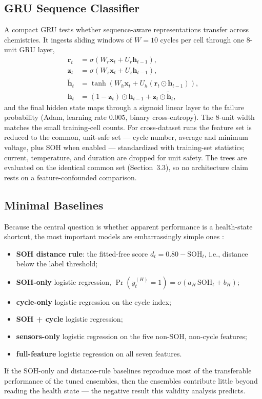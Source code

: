 \documentclass[preprint,12pt]{elsarticle}
\begin{document}
\subsection{GRU Sequence Classifier}
A compact GRU tests whether sequence-aware representations transfer across chemistries. It ingests sliding windows of $W{=}10$ cycles per cell through one 8-unit GRU layer,
\begin{equation}\label{eq:gru}
\begin{aligned}
\mathbf{r}_t &= \sigma(W_r\mathbf{x}_t + U_r\mathbf{h}_{t-1}),\\[2pt]
\mathbf{z}_t &= \sigma(W_z\mathbf{x}_t + U_z\mathbf{h}_{t-1}),\\[2pt]
\tilde{\mathbf{h}}_t &= \tanh(W_h\mathbf{x}_t + U_h(\mathbf{r}_t\odot\mathbf{h}_{t-1})),\\[2pt]
\mathbf{h}_t &= (1-\mathbf{z}_t)\odot\mathbf{h}_{t-1} + \mathbf{z}_t\odot\tilde{\mathbf{h}}_t,
\end{aligned}
\end{equation}
and the final hidden state maps through a sigmoid linear layer to the failure probability (Adam, learning rate 0.005, binary cross-entropy). The 8-unit width matches the small training-cell counts. For cross-dataset runs the feature set is reduced to the common, unit-safe set --- cycle number, average and minimum voltage, plus SOH when enabled --- standardized with training-set statistics; current, temperature, and duration are dropped for unit safety. The trees are evaluated on the identical common set (Section~3.3), so no architecture claim rests on a feature-confounded comparison.

\subsection{Minimal Baselines}
Because the central question is whether apparent performance is a health-state shortcut, the most important models are embarrassingly simple ones \cite{shikdar2026learning}:
\begin{itemize}
\item \textbf{SOH distance rule}: the fitted-free score $d_t = 0.80 - \mathrm{SOH}_t$, i.e., distance below the label threshold;
\item \textbf{SOH-only} logistic regression, $\Pr(y_t^{(H)}{=}1)=\sigma(a_H\,\mathrm{SOH}_t+b_H)$;
\item \textbf{cycle-only} logistic regression on the cycle index;
\item \textbf{SOH + cycle} logistic regression;
\item \textbf{sensors-only} logistic regression on the five non-SOH, non-cycle features;
\item \textbf{full-feature} logistic regression on all seven features.
\end{itemize}
If the SOH-only and distance-rule baselines reproduce most of the transferable performance of the tuned ensembles, then the ensembles contribute little beyond reading the health state --- the negative result this validity analysis predicts.
\end{document}
